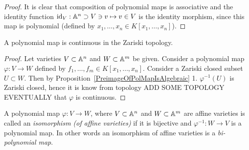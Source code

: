 \begin{proof}
    It is clear that composition of polynomial maps is associative and the identity function $\text{id}_V:\mathbb{A}^n \supset V\ni v\mapsto v\in V$ is the identity morphism, since this map is polynomial (defined by $x_1,\dots,x_n\in K[x_1,\dots,x_n]$).
\end{proof}
\begin{proposition}
    A polynomial map is continuous in the Zariski topology.
\end{proposition}
\begin{proof}
    Let varieties $V\subset \mathbb{A}^n$ and $W\subset \mathbb{A}^m$ be given. Consider a polynomial map $\varphi : V\rightarrow W$ defined by $f_1,\dots,f_m\in K[x_1,\dots,x_n]$. Consider a Zariski closed subset $U\subset W$. Then by Proposition~\ref{PreimageOfPolMapIsAlgebraic} 1. $\varphi^{-1}(U)$ is Zariski closed, hence it is know from topology {\Large ADD SOME TOPOLOGY EVENTUALLY} that $\varphi$ is continuous. 
\end{proof}
\begin{definition}
    A polynomial map $\varphi: V\rightarrow W$, where $V\subset \mathbb{A}^n$ and $W\subset \mathbb{A}^m$ are affine varieties is called an \textit{isomorphism (of affine varieties)} if it is bijective and $\varphi^{-1} : W \rightarrow V$ is a polynomial map. In other words an isomorphism of affine varieties is a \textit{bi-polynomial map}.
\end{definition}

